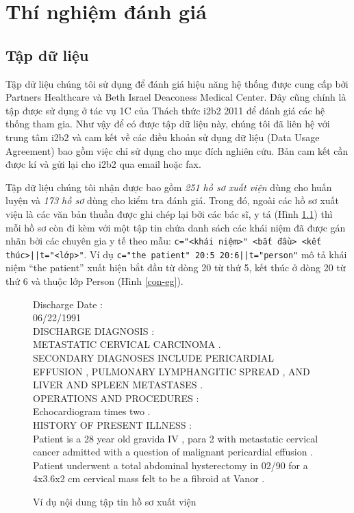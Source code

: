 \chapter{Thí nghiệm đánh giá}
\section{Tập dữ liệu}
Tập dữ liệu chúng tôi sử dụng để đánh giá hiệu năng hệ thống được cung cấp bởi Partners Healthcare và Beth Israel Deaconess Medical Center. Đây cũng chính là tập được sử dụng ở tác vụ 1C của Thách thức i2b2 2011 để đánh giá các hệ thống tham gia. Như vậy để có được tập dữ liệu này, chúng tôi đã liên hệ với trung tâm i2b2 và cam kết về các điều khoản sử dụng dữ liệu (Data Usage Agreement) bao gồm việc chỉ sử dụng cho mục đích nghiên cứu. Bản cam kết cần được kí và gửi lại cho i2b2 qua email hoặc fax.

Tập dữ liệu chúng tôi nhận được bao gồm \emph{251 hồ sơ xuất viện} dùng cho huấn luyện và \emph{173 hồ sơ} dùng cho kiểm tra đánh giá. Trong đó, ngoài các hồ sơ xuất viện là các văn bản thuần được ghi chép lại bởi các bác sĩ, y tá (Hình \ref{hsxv-eg}) thì mỗi hồ sơ còn đi kèm với một tập tin chứa danh sách các khái niệm đã được gán nhãn bởi các chuyên gia y tế theo mẫu: \texttt{c="<khái niệm>" <bắt đầu> <kết thúc>||t="<lớp>"}. Ví dụ \texttt{c="the patient" 20:5 20:6||t="person"} mô tả khái niệm ``the patient'' xuất hiện bắt đầu từ dòng 20 từ thứ 5, kết thúc ở dòng 20 từ thứ 6 và thuộc lớp Person (Hình \ref{con-eg}).

\begin{figure}[ht]
\begin{mdframed}
\ttfamily\footnotesize
\protect\raggedright
Discharge Date :\\
06/22/1991\\
DISCHARGE DIAGNOSIS :\\
METASTATIC CERVICAL CARCINOMA .\\
SECONDARY DIAGNOSES INCLUDE PERICARDIAL EFFUSION , PULMONARY LYMPHANGITIC SPREAD , AND LIVER AND SPLEEN METASTASES .\\
OPERATIONS AND PROCEDURES :\\
Echocardiogram times two .\\
HISTORY OF PRESENT ILLNESS :\\
Patient is a 28 year old gravida IV , para 2 with metastatic cervical cancer admitted with a question of malignant pericardial effusion .\\
Patient underwent a total abdominal hysterectomy in 02/90 for a 4x3.6x2 cm cervical mass felt to be a fibroid at Vanor .
\end{mdframed}
\caption{Ví dụ nội dung tập tin hồ sơ xuất viện\label{hsxv-eg}}
\end{figure}

